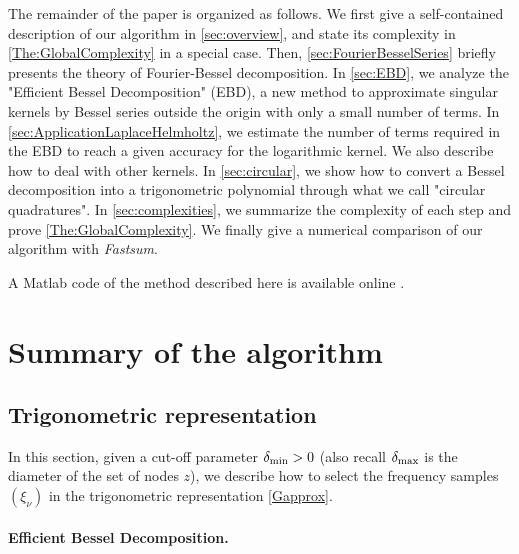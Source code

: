 \documentclass[smallextended]{svjour3}
\begin{document}
The remainder of the paper is organized as follows. We first give a self-contained description of our algorithm in \autoref{sec:overview}, and state its complexity in \autoref{The:GlobalComplexity} in a special case. Then, \autoref{sec:FourierBesselSeries} briefly presents the theory of Fourier-Bessel decomposition. In \autoref{sec:EBD}, we analyze the "Efficient Bessel Decomposition" (EBD), a new method to approximate singular kernels by Bessel series outside the origin with only a small number of terms. In \autoref{sec:ApplicationLaplaceHelmholtz}, we estimate the number of terms required in the EBD to reach a given accuracy for the logarithmic kernel. We also describe how to deal with other kernels. In \autoref{sec:circular}, we show how to convert a Bessel decomposition into a trigonometric polynomial through what we call "circular quadratures". In \autoref{sec:complexities}, we summarize the complexity of each step and prove \autoref{The:GlobalComplexity}. We finally give a numerical comparison of our algorithm with \textit{Fastsum}. 

A Matlab code of the method described here is available online \cite{EBD}. 

\section{Summary of the algorithm}

\setcounter{equation}{0}
\label{sec:overview}

\subsection{Trigonometric representation}

In this section, given a cut-off parameter $\delta_{\min} > 0$ (also recall $\delta_{\max}$ is the diameter of the set of nodes $z$), we describe how to select the frequency samples $(\xi_\nu)$ in the trigonometric representation \eqref{Gapprox}.

\paragraph{Efficient Bessel Decomposition.} 
\end{document}
